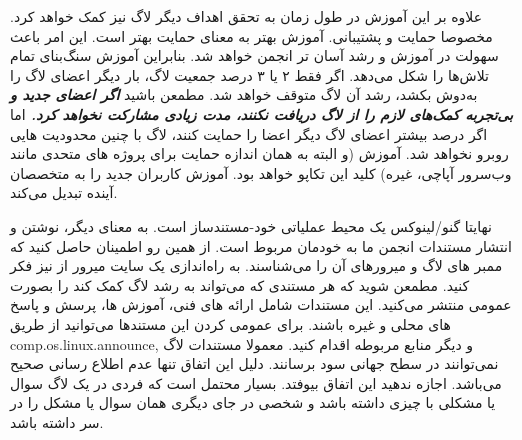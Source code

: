 علاوه بر این آموزش در طول زمان به تحقق اهداف دیگر لاگ نیز کمک خواهد کرد.
مخصوصا حمایت و پشتیبانی. آموزش بهتر به معنای حمایت بهتر است.
این امر باعث سهولت در آموزش و رشد آسان تر انجمن خواهد شد.
بنابراین آموزش سنگ‌بنای تمام تلاش‌ها را شکل می‌دهد.
اگر فقط ۲ یا ۳ درصد جمعیت لاگ، بار دیگر اعضای لاگ را به‌دوش بکشد،
رشد آن لاگ متوقف خواهد شد. مطمعن باشید
{\bfseries {\itshape
اگر اعضای جدید و بی‌تجربه کمک‌های لازم را از لاگ دریافت نکنند، مدت زیادی مشارکت نخواهد کرد.
}}
اما اگر درصد بیشتر اعضای لاگ دیگر اعضا را حمایت کنند، لاگ با چنین محدودیت هایی روبرو نخواهد شد.
آموزش (و البته به همان اندازه حمایت برای پروژه های متحدی مانند وب‌سرور آپاچی،
 غیره) کلید این تکاپو خواهد بود. آموزش کاربران جدید را به متخصصان آینده تبدیل می‌کند.

نهایتا گنو/لینوکس یک محیط عملیاتی خود-مستندساز است.
به معنای دیگر، نوشتن و انتشار مستندات انجمن ما به خودمان مربوط است.
از همین رو اطمینان حاصل کنید که ممبر های لاگ
و میرورهای آن را می‌شناسند.
به راه‌اندازی یک سایت میرور از  نیز فکر کنید.
مطمعن شوید که هر مستندی که می‌تواند به رشد لاگ کمک کند را
بصورت عمومی منتشر می‌کنید. این مستندات شامل ارائه های فنی، آموزش ها،
پرسش و پاسخ های محلی و غیره باشند. برای عمومی کردن این مستندها می‌توانید
از طریق
{\ttfamily comp.os.linux.announce}, 
و دیگر منابع مربوطه اقدام کنید.
معمولا مستندات لاگ نمی‌توانند در سطح جهانی سود برسانند. دلیل این اتفاق
تنها عدم اطلاع رسانی صحیح می‌باشد. اجازه ندهید این اتفاق بیوفتد.
بسیار محتمل است که فردی در یک لاگ سوال یا مشکلی با چیزی داشته باشد
و شخصی در جای دیگری همان سوال یا مشکل را در سر داشته باشد.
 
